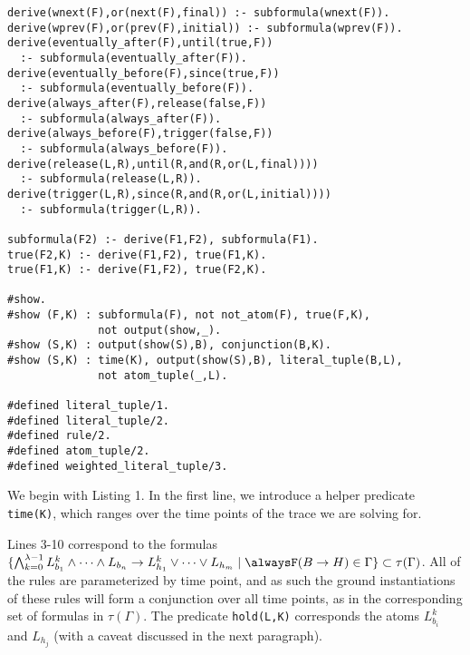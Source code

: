 \begin{center}
\begin{minipage}{\linewidth}
  \begin{lstlisting}[language=clingo, label={lst:meta-telingo2}]
derive(wnext(F),or(next(F),final)) :- subformula(wnext(F)).
derive(wprev(F),or(prev(F),initial)) :- subformula(wprev(F)).
derive(eventually_after(F),until(true,F)) 
  :- subformula(eventually_after(F)).
derive(eventually_before(F),since(true,F)) 
  :- subformula(eventually_before(F)).
derive(always_after(F),release(false,F)) 
  :- subformula(always_after(F)).
derive(always_before(F),trigger(false,F)) 
  :- subformula(always_before(F)).
derive(release(L,R),until(R,and(R,or(L,final)))) 
  :- subformula(release(L,R)).
derive(trigger(L,R),since(R,and(R,or(L,initial)))) 
  :- subformula(trigger(L,R)).

subformula(F2) :- derive(F1,F2), subformula(F1).
true(F2,K) :- derive(F1,F2), true(F1,K).
true(F1,K) :- derive(F1,F2), true(F2,K).

#show.
#show (F,K) : subformula(F), not not_atom(F), true(F,K), 
              not output(show,_).
#show (S,K) : output(show(S),B), conjunction(B,K).
#show (S,K) : time(K), output(show(S),B), literal_tuple(B,L), 
              not atom_tuple(_,L).

#defined literal_tuple/1.
#defined literal_tuple/2.
#defined rule/2.
#defined atom_tuple/2.
#defined weighted_literal_tuple/3.
\end{lstlisting}
\end{minipage}
\end{center}

We begin with Listing 1. In the first line, we introduce a helper
predicate \verb|time(K)|, which ranges over the time points of the trace we
are solving for. 

Lines 3-10 correspond to the formulas
$\{ \bigwedge_{k=0}^{\lambda-1} L_{b_1}^k \land \dots \land L_{b_n}
\rightarrow L_{h_1}^k \lor \dots \lor L_{h_m} \mid \tempruleshort \in
\Gamma \} \subset \tau(\Gamma)$. All of the rules are parameterized by
time point, and as such the ground instantiations of these rules will
form a conjunction over all time points, as in the corresponding set
of formulas in $\tau(\Gamma)$. The predicate \verb|hold(L,K)|
corresponds the atoms $L_{b_i}^k$ and $L_{h_j}$ (with a caveat
discussed in the next paragraph).

